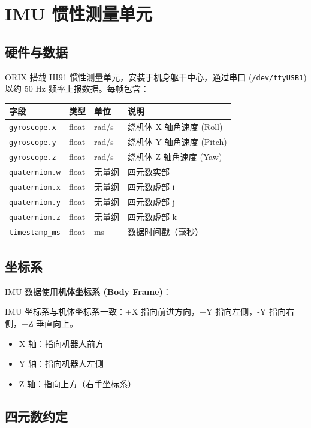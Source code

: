 \documentclass[a4paper,11pt,openany]{book}
\begin{document}
\section{IMU 惯性测量单元}

\subsection{硬件与数据}

ORIX 搭载 HI91 惯性测量单元，安装于机身躯干中心，通过串口 (\texttt{/dev/ttyUSB1}) 以约 50 Hz 频率上报数据。每帧包含：

\begin{longtable}{llll}
\toprule
字段 & 类型 & 单位 & 说明 \\
\midrule
\endhead
\texttt{gyroscope.x} & float & rad/s & 绕机体 X 轴角速度 (Roll) \\
\texttt{gyroscope.y} & float & rad/s & 绕机体 Y 轴角速度 (Pitch) \\
\texttt{gyroscope.z} & float & rad/s & 绕机体 Z 轴角速度 (Yaw) \\
\texttt{quaternion.w} & float & 无量纲 & 四元数实部 \\
\texttt{quaternion.x} & float & 无量纲 & 四元数虚部 i \\
\texttt{quaternion.y} & float & 无量纲 & 四元数虚部 j \\
\texttt{quaternion.z} & float & 无量纲 & 四元数虚部 k \\
\texttt{timestamp\_ms} & float & ms & 数据时间戳（毫秒） \\
\bottomrule
\end{longtable}

\subsection{坐标系}

IMU 数据使用\textbf{机体坐标系 (Body Frame)}：

IMU 坐标系与机体坐标系一致：+X 指向前进方向，+Y 指向左侧，-Y 指向右侧，+Z 垂直向上。

\begin{itemize}[nosep]
  \item X 轴：指向机器人前方
  \item Y 轴：指向机器人左侧
  \item Z 轴：指向上方（右手坐标系）
\end{itemize}

\subsection{四元数约定}
\end{document}
